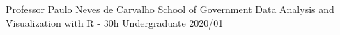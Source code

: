 \begin{cventries}

    \cventry
    {Professor Paulo Neves de Carvalho School of Government}
    {Data Analysis and Visualization with R - 30h}
    {Undergraduate}
    {2020/01}
    {
      \begin{cvitems}
      \end{cvitems}
    }

\end{cventries}
